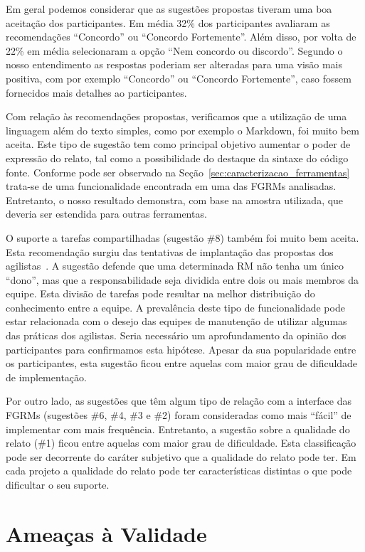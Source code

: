 Em geral podemos considerar que as sugestões propostas tiveram uma boa aceitação
dos participantes. Em média 32\% dos participantes avaliaram as recomendações
``Concordo'' ou ``Concordo Fortemente''.  Além disso, por volta de 22\% em média
selecionaram a opção ``Nem concordo ou discordo''. Segundo o nosso entendimento
as respostas poderiam ser alteradas para uma visão mais positiva, com por
exemplo ``Concordo'' ou ``Concordo Fortemente'', caso fossem fornecidos mais
detalhes ao participantes.

Com relação às recomendações propostas, verificamos que a utilização de uma
linguagem além do texto simples, como por exemplo o Markdown, foi muito bem
aceita. Este tipo de sugestão tem como principal objetivo aumentar o poder
de expressão do relato, tal como a possibilidade do destaque da sintaxe do
código fonte. Conforme pode ser observado na
Seção~\ref{sec:caracterizacao_ferramentas} trata-se de uma funcionalidade
encontrada em uma das FGRMs analisadas. Entretanto, o nosso resultado demonstra,
com base na amostra utilizada, que deveria ser estendida para outras
ferramentas.

O suporte a tarefas compartilhadas (sugestão \#8) também foi muito bem aceita.
Esta recomendação surgiu das tentativas de implantação das propostas dos
agilistas~\cite{svensson2005introducing}. A sugestão defende que uma
determinada RM não tenha um único ``dono'', mas que a responsabilidade seja
dividida entre dois ou mais membros da equipe. Esta divisão de tarefas pode
resultar na melhor distribuição do conhecimento entre a equipe. A prevalência
deste tipo de funcionalidade pode estar relacionada com o desejo das equipes de
manutenção de utilizar algumas das práticas dos agilistas. Seria necessário um
aprofundamento da opinião dos participantes para confirmamos esta hipótese.
Apesar da sua popularidade entre os participantes, esta sugestão ficou entre
aquelas com maior grau de dificuldade de implementação.

Por outro lado, as sugestões que têm algum tipo de relação com a interface das
FGRMs (sugestões \#6, \#4, \#3 e \#2) foram consideradas como mais ``fácil'' de
implementar com mais frequência. Entretanto, a sugestão sobre a qualidade do
relato (\#1) ficou entre aquelas com maior grau de dificuldade. Esta
classificação pode ser decorrente do caráter subjetivo que a qualidade do relato
pode ter. Em cada projeto a qualidade do relato pode ter características
distintas o que pode dificultar o seu suporte.

\section{Ameaças à Validade}
\label{sec:sug_melhoria_ameacas}

